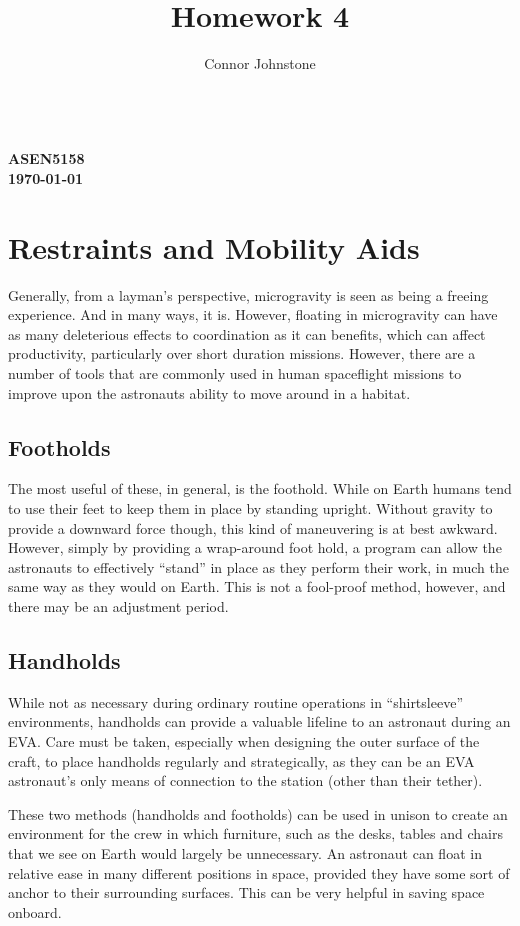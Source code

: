 \documentclass{article}
\renewcommand{\maketitle}{\hspace{-22px}  \textbf{{\theauthor} \\
ASEN5158 \\
\today \\
{\thetitle}} \titlerule}
\begin{document}
  \title{Homework 4}
  \author{Connor Johnstone}

  \maketitle


  \section{Restraints and Mobility Aids}

  Generally, from a layman's perspective, microgravity is seen as being a freeing experience. And in many ways, it is. However, floating in microgravity can have as many deleterious effects to coordination as it can benefits, which can affect productivity, particularly over short duration missions\cite{novak}. However, there are a number of tools that are commonly used in human spaceflight missions to improve upon the astronauts ability to move around in a habitat.

  \subsection{Footholds}

  The most useful of these, in general, is the foothold. While on Earth humans tend to use their feet to keep them in place by standing upright. Without gravity to provide a downward force though, this kind of maneuvering is at best awkward. However, simply by providing a wrap-around foot hold, a program can allow the astronauts to effectively ``stand'' in place as they perform their work, in much the same way as they would on Earth. This is not a fool-proof method, however, and there may be an adjustment period.

  \subsection{Handholds}

  While not as necessary during ordinary routine operations in ``shirtsleeve'' environments, handholds can provide a valuable lifeline to an astronaut during an EVA. Care must be taken, especially when designing the outer surface of the craft, to place handholds regularly and strategically, as they can be an EVA astronaut's only means of connection to the station (other than their tether).

  These two methods (handholds and footholds) can be used in unison to create an environment for the crew in which furniture, such as the desks, tables and chairs that we see on Earth would largely be unnecessary. An astronaut can float in relative ease in many different positions in space, provided they have some sort of anchor to their surrounding surfaces. This can be very helpful in saving space onboard.
\end{document}
